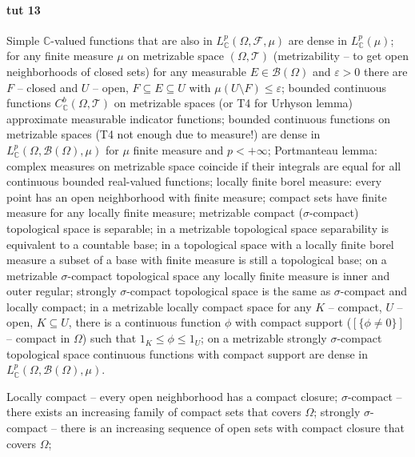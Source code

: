 \documentclass[a4paper]{article}
\newcommand{\Fcal}{\mathcal{F}}
\newcommand{\Tcal}{\mathcal{T}}
\newcommand{\Bcal}{\mathcal{B}}
\newcommand{\cplx}{\mathbb{C}}
\begin{document}


\paragraph{tut 13} %
\label{par:tut_13}

Simple $\cplx$-valued functions that are also in $L^p_\cplx(\Omega, \Fcal, \mu)$ are
dense in $L^p_\cplx(\mu)$;
%
for any finite measure $\mu$ on metrizable space $(\Omega, \Tcal)$
(metrizability -- to get open neighborhoods of closed sets) for any measurable
$E \in \Bcal(\Omega)$ and $\varepsilon > 0$ there are $F$ -- closed and $U$ -- open,
$F \subseteq E \subseteq U$ with $\mu(U \setminus F) \leq \varepsilon$;
%
bounded continuous functions $C_\cplx^b(\Omega, \Tcal)$ on metrizable spaces
(or T4 for Urhyson lemma) approximate measurable indicator functions;
%
bounded continuous functions on metrizable spaces (T4 not enough due to measure!)
are dense in $L^p_\cplx(\Omega, \Bcal(\Omega), \mu)$ for $\mu$ finite measure and
$p < +\infty$;
%
Portmanteau lemma: complex measures on metrizable space coincide if their integrals
are equal for all continuous bounded real-valued functions;
%
locally finite borel measure: every point has an open neighborhood with finite measure;
%
compact sets have finite measure for any locally finite measure;
%
metrizable compact ($\sigma$-compact) topological space is separable;
%
in a metrizable topological space separability is equivalent to a countable base;
%
in a topological space with a locally finite borel measure a subset of a base with finite
measure is still a topological base;
%
on a metrizable $\sigma$-compact topological space any locally finite measure is
inner and outer regular;
%
strongly $\sigma$-compact topological space is the same as $\sigma$-compact and
locally compact;
%
in a metrizable locally compact space for any $K$ -- compact, $U$ -- open, $K \subseteq U$,
there is a continuous function $\phi$ with compact support ($[\{\phi \neq 0\}]$
-- compact in $\Omega$) such that $1_K \leq \phi \leq 1_U$;
%
on a metrizable strongly $\sigma$-compact topological space continuous functions
with compact support are dense in $L^p_\cplx(\Omega, \Bcal(\Omega), \mu)$.

Locally compact -- every open neighborhood has a compact closure;
%
$\sigma$-compact -- there exists an increasing family of compact sets that covers $\Omega$;
%
strongly $\sigma$-compact -- there is an increasing sequence of open sets with compact
closure that covers $\Omega$;
\end{document}
